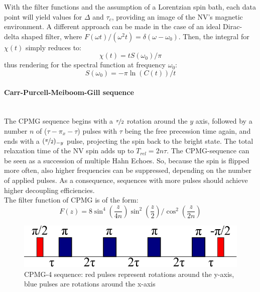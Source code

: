 \documentclass[12pt,a4paper]{article}
\begin{document}
With the filter functions and the assumption of a Lorentzian spin bath, each data point will yield values for $\Delta$ and $\tau_c$, providing an image of the NV's magnetic environment.
A different approach can be made in the case of an ideal Dirac-delta shaped filter, where $F(\omega t)/(\omega^2t)=\delta(\omega-\omega_0)$. Then, the integral for $\chi(t)$ simply reduces to:
\begin{equation}
\chi(t)=tS(\omega_0)/\pi
\end{equation} 
thus rendering for the spectral function at frequency $\omega_0$\cite{ssbd}:
\begin{equation}
S(\omega_0)=-\pi\ln(C(t))/t
\end{equation}
\paragraph{Carr-Purcell-Meiboom-Gill sequence}\mbox{}\\
The CPMG sequence begins with a $\nicefrac{\pi}{2}$ rotation around the $y$ axis, followed by a number $n$ of ($\tau-\pi_x-\tau$) pulses with $\tau$ being the free precession time again, and ends with a $(\nicefrac{\pi}{2})_{-y}$ pulse, projecting the spin back to the bright state. The total relaxation time of the NV spin adds up to $T_{rel}=2n\tau$. The CPMG-sequence can be seen as a succession of multiple Hahn Echoes. So, because the spin is flipped more often, also higher frequencies can be suppressed, depending on the number of applied pulses. As a consequence, sequences with more pulses should achieve higher decoupling efficiencies.\\
The filter function of CPMG is of the form:
\begin{equation} F(z)=8\sin^4\left(\frac{z}{4n}\right)\sin^2\left(\frac{z}{2}\right)/\cos^2\left(\frac{z}{2n}\right)
\end{equation}
\begin{figure}[H]
\centering
\includegraphics[scale=0.4]{CPMG41.png} 
\caption{CPMG-4 sequence: red pulses represent rotations around the y-axis, blue pulses are rotations around the x-axis}
\end{figure} 
\end{document}

